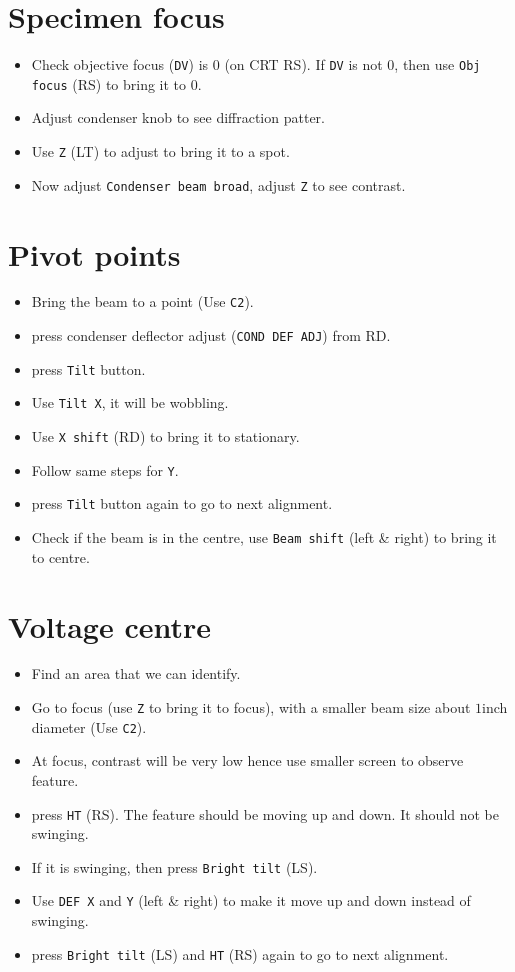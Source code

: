 \documentclass[letterpaper,12pt]{article}
\begin{document}
\section{Specimen focus}
\begin{itemize}
\item Check objective focus (\texttt{DV}) is $0$ (on CRT RS\footnotemark[1]). If \texttt{DV} is not $0$, then use \texttt{Obj focus} (RS\footnotemark[1]) to bring it to $0$.
\item Adjust condenser knob to see diffraction patter.
\item Use \texttt{Z} (LT\footnotemark[1]) to adjust to bring it to a spot.
\item Now adjust \texttt{Condenser beam broad}, adjust \texttt{Z} to see contrast.
\end{itemize}

\section{Pivot points}
\begin{itemize}
\item Bring the beam to a point (Use \texttt{C2}).
\item press condenser deflector adjust (\texttt{COND DEF ADJ}) from RD\footnotemark[1].
\item press \texttt{Tilt} button.
\item Use \texttt{Tilt X}, it will be wobbling.
\item Use \texttt{X shift} (RD\footnotemark[1]) to bring it to stationary.
\item Follow same steps for \texttt{Y}.
\item press \texttt{Tilt} button again to go to next alignment.
\item Check if the beam is in the centre, use \texttt{Beam shift} (left \& right) to bring it to centre.
\end{itemize}

\section{Voltage centre}
\begin{itemize}
\item Find an area that we can identify.
\item Go to focus (use \texttt{Z} to bring it to focus), with a smaller beam size about $1$inch diameter (Use \texttt{C2}).
\item At focus, contrast will be very low hence use smaller screen to observe feature.
\item press \texttt{HT} (RS\footnotemark[1]). The feature should be moving up and down. It should not be swinging.
\item If it is swinging, then press \texttt{Bright tilt} (LS\footnotemark[1]).
\item Use \texttt{DEF X} and \texttt{Y} (left \& right) to make it move up and down instead of swinging.
\item press \texttt{Bright tilt} (LS\footnotemark[1]) and \texttt{HT} (RS\footnotemark[1]) again to go to next alignment.
\end{itemize}
\end{document}
